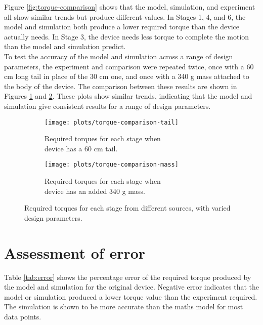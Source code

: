 Figure \ref{fig:torque-comparison} shows that the model, simulation, and experiment all show similar trends but produce different values. In Stages 1, 4, and 6, the model and simulation both produce a lower required torque than the device actually needs. In Stage 3, the device needs less torque to complete the motion than the model and simulation predict.\\
To test the accuracy of the model and simulation across a range of design parameters, the experiment and comparison were repeated twice, once with a 60 cm long tail in place of the 30 cm one, and once with a 340 g mass attached to the body of the device. The comparison between these results are shown in Figures \ref{fig:torque-comparison-tail} and \ref{fig:torque-comparison-mass}. These plots show similar trends, indicating that the model and simulation give consistent results for a range of design parameters.

\begin{figure}
	\centering
	\begin{subfigure}{.5\textwidth}
		\centering
		\texttt{[image: plots/torque-comparison-tail]}
		\caption{Required torques for each stage when \\device has a 60 cm tail.}
		\label{fig:torque-comparison-tail}
	\end{subfigure}%
	\begin{subfigure}{.5\textwidth}
		\centering
		\texttt{[image: plots/torque-comparison-mass]}
		\caption{Required torques for each stage when \\device has an added 340 g mass.}
		\label{fig:torque-comparison-mass}
	\end{subfigure}
	\caption{Required torques for each stage from different sources, with varied design parameters.}
	\label{fig:torque-comparison-tailMass}
\end{figure}


 
\section{Assessment of error}

Table \ref{tab:error} shows the percentage error of the required torque produced by the model and simulation for the original device. Negative error indicates that the model or simulation produced a lower torque value than the experiment required. The simulation is shown to be more accurate than the maths model for most data points.\\
 

